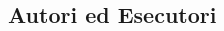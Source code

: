 \documentclass[8pt, twoside, a5paper]{extreport}
\newcommand\blankpage{%
    \null
    \thispagestyle{empty}%
    \addtocounter{page}{-1}%
    \newpage}
\begin{document}
\bigskip

\vspace{3mm}

\begin{multicols}{2}




\end{multicols}

\afterpage{\blankpage}

\afterpage{\blankpage}


\section*{ }

\subsection*{\textsf{Autori ed Esecutori}\\}

{\fontsize{30}{30} }

\bigskip

\begin{multicols}{2}




\end{multicols}

\clearpage

\section*{ }



\begin{center}



\end{center}


\end{document}

